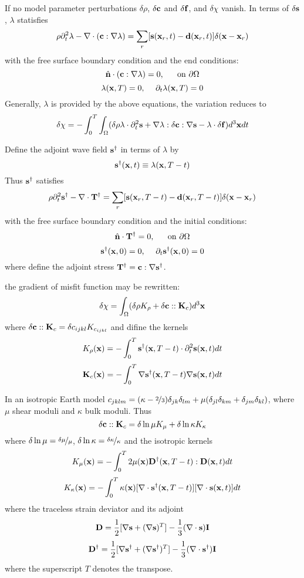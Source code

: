 If no model parameter perturbations $\delta\rho$, $\delta\mathbf{c}$ and $\delta\mathbf{f}$,
and $\delta\chi$ vanish.
In terms of $\delta\mathbf{s}$, $\lambda$ statisfies
\[ \rho\partial_t^2\lambda-\nabla\cdot(\mathbf{c}:\nabla\lambda)=\sum_r[\mathbf{s}(\mathbf{x}_r,t)-\mathbf{d}(\mathbf{x}_r,t)]\delta(\mathbf{x}-\mathbf{x}_r) \]
with the free surface boundary condition and the end conditions:
\[ \hat{\mathbf{n}}\cdot(\mathbf{c}:\nabla\lambda)=0 \text{,\hspace{5mm} on } \partial\Omega \]
\[ \lambda(\mathbf{x},T)=0 \text{,\hspace{5mm}} \partial_t\lambda(\mathbf{x},T)=0 \]
Generally, $\lambda$ is provided by the above equations, the variation reduces to
\[ \delta\chi=-\int_0^T\int_\Omega(\delta\rho\lambda\cdot\partial_t^2\mathbf{s}+\nabla\lambda:\delta\mathbf{c}:\nabla\mathbf{s}-\lambda\cdot\delta\mathbf{f})d^3\mathbf{x}dt \]

Define the adjoint wave field $\mathbf{s}^\dagger$ in terms of $\lambda$ by
\[ \mathbf{s}^\dagger(\mathbf{x},t)\equiv\lambda(\mathbf{x},T-t) \]
Thus $\mathbf{s}^\dagger$ satisfies
\[ \rho\partial_t^2\mathbf{s}^\dagger-\nabla\cdot\mathbf{T}^\dagger=\sum_r[\mathbf{s}(\mathbf{x}_r,T-t)-\mathbf{d}(\mathbf{x}_r,T-t)]\delta(\mathbf{x}-\mathbf{x}_r) \]
with the free surface boundary condition and the initial conditions:
\[ \hat{\mathbf{n}}\cdot\mathbf{T}^\dagger=0 \text{,\hspace{5mm} on } \partial\Omega \]
\[ \mathbf{s}^\dagger(\mathbf{x},0)=0 \text{,\hspace{5mm}} \partial_t\mathbf{s}^\dagger(\mathbf{x},0)=0 \]
where define the adjoint stress $\mathbf{T}^\dagger=\mathbf{c}:\nabla\mathbf{s}^\dagger$.

the gradient of misfit function may be rewritten:
\[ \delta\chi=\int_\Omega(\delta\rho K_\rho+\delta\mathbf{c}::\mathbf{K}_c)d^3\mathbf{x} \]
where $\delta\mathbf{c}::\mathbf{K}_c=\delta c_{ijkl}K_{c_{ijkl}}$ and difine the kernels
\[ K_\rho(\mathbf{x})=-\int_0^T\mathbf{s}^\dagger(\mathbf{x},T-t)\cdot\partial_t^2\mathbf{s}(\mathbf{x},t)dt \]
\[ \mathbf{K}_c(\mathbf{x})=-\int_0^T\nabla\mathbf{s}^\dagger(\mathbf{x},T-t)\nabla\mathbf{s}(\mathbf{x},t)dt \]

In an isotropic Earth model
$c_{jklm}=(\kappa-\nicefrac{2}{3})\delta_{jk}\delta_{lm}+\mu(\delta_{jl}\delta_{km}+\delta_{jm}\delta_{kl})$,
where $\mu$ shear moduli and $\kappa$ bulk moduli.
Thus
\[ \delta\mathbf{c}::\mathbf{K}_c=\delta\ln\mu K_\mu+\delta\ln\kappa K_\kappa \]
where $\delta\ln\mu=\nicefrac{\delta\mu}{\mu}$, $\delta\ln\kappa=\nicefrac{\delta\kappa}{\kappa}$
and the isotropic kernels
\[ K_\mu(\mathbf{x})=-\int_0^T2\mu(\mathbf{x})\mathbf{D}^\dagger(\mathbf{x},T-t):\mathbf{D}(\mathbf{x},t)dt \]
\[ K_\kappa(\mathbf{x})=-\int_0^T\kappa(\mathbf{x})[\nabla\cdot\mathbf{s}^\dagger(\mathbf{x},T-t)][\nabla\cdot\mathbf{s}(\mathbf{x},t)]dt \]
where the traceless strain deviator and its adjoint
\[ \mathbf{D}=\frac{1}{2}[\nabla\mathbf{s}+(\nabla\mathbf{s})^T]-\frac{1}{3}(\nabla\cdot\mathbf{s})\mathbf{I} \]
\[ \mathbf{D}^\dagger=\frac{1}{2}[\nabla\mathbf{s}^\dagger+(\nabla\mathbf{s}^\dagger)^T]-\frac{1}{3}(\nabla\cdot\mathbf{s}^\dagger)\mathbf{I} \]
where the superscript $T$ denotes the transpose.

